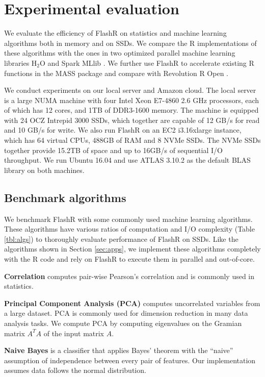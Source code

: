 \section{Experimental evaluation}
We evaluate the efficiency of FlashR on statistics and machine learning
algorithms both in memory and on SSDs. We compare the R implementations of
these algorithms with the ones in two optimized parallel machine learning
libraries H$_2$O \cite{h2o} and Spark MLlib \cite{mllib}. We further use FlashR
to accelerate existing R functions in the MASS package and compare with
Revolution R Open \cite{rro}.

We conduct experiments on our local server and Amazon cloud. The local server
is a large NUMA machine with four Intel Xeon E7-4860 2.6 GHz processors,
each of which has 12 cores, and 1TB of DDR3-1600 memory. The machine is equipped
with 24 OCZ Intrepid 3000 SSDs, which together are capable of 12 GB/s for read
and 10 GB/s for write. We also run FlashR on an EC2 i3.16xlarge instance,
which has 64 virtual CPUs, 488GB of RAM and 8 NVMe SSDs. The NVMe SSDs together
provide 15.2TB of space and up to 16GB/s of sequential I/O throughput.
We run Ubuntu 16.04 and use ATLAS 3.10.2 as the default BLAS library on both
machines.

\subsection{Benchmark algorithms}\label{benchalg}
We benchmark FlashR with some commonly used machine learning algorithms.
These algorithms have various ratios of computation and I/O complexity
(Table \ref{tbl:algs}) to thoroughly evaluate performance of FlashR on SSDs.
Like the algorithms
shown in Section \ref{sec:apps}, we implement these algorithms completely with
the R code and rely on FlashR to execute them in parallel and out-of-core.

\noindent \textbf{Correlation} computes pair-wise Pearson's correlation
\cite{cor} and is commonly used in statistics.

\noindent \textbf{Principal Component Analysis (PCA)} computes uncorrelated
variables from a large dataset. PCA is commonly used for dimension reduction
in many data analysis tasks. We compute PCA by computing eigenvalues on the Gramian
matrix $A^T A$ of the input matrix $A$.

\noindent \textbf{Naive Bayes} is a classifier that applies Bayes' theorem
with the ``naive'' assumption of independence between every pair of features.
Our implementation assumes data follows the normal distribution.

